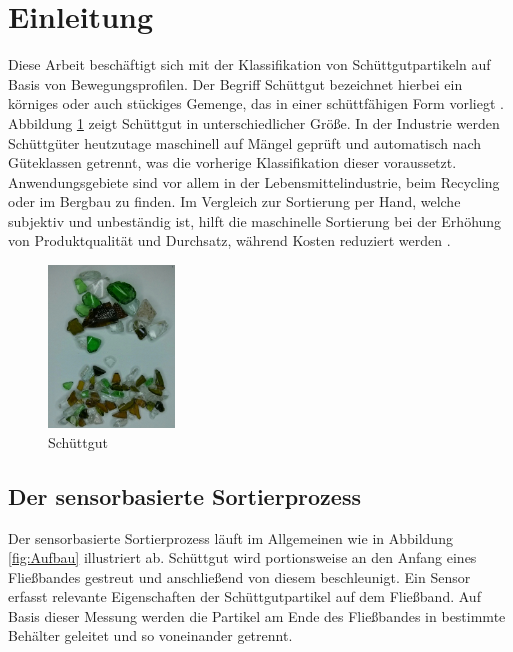 
\section{Einleitung}
Diese Arbeit beschäftigt sich mit der Klassifikation von Schüttgutpartikeln auf Basis von Bewegungsprofilen. Der Begriff Schüttgut bezeichnet hierbei ein körniges oder auch stückiges Gemenge, das in einer schüttfähigen Form vorliegt \cite{SchuettgutDef}. Abbildung \ref{fig:Schuettgut} zeigt Schüttgut in unterschiedlicher Größe. In der Industrie werden Schüttgüter heutzutage maschinell auf Mängel geprüft und automatisch nach Güteklassen getrennt, was die vorherige Klassifikation dieser voraussetzt. Anwendungsgebiete sind vor allem in der Lebensmittelindustrie, beim Recycling oder im Bergbau zu finden. Im Vergleich zur Sortierung per Hand, welche subjektiv und unbeständig ist, hilft die maschinelle Sortierung bei der Erhöhung von Produktqualität und Durchsatz, während Kosten reduziert werden \cite{FoodQuality}.

\begin{figure}[!h]
    \centering
    \includegraphics[width=0.3\textwidth]{pics/Schuettgut.png}
    \caption{Schüttgut}
    \label{fig:Schuettgut}
\end{figure}

\subsection{Der sensorbasierte Sortierprozess}
Der sensorbasierte Sortierprozess läuft im Allgemeinen wie in Abbildung \ref{fig:Aufbau} illustriert ab. Schüttgut wird portionsweise an den Anfang eines Fließbandes gestreut und anschließend von diesem beschleunigt. Ein Sensor erfasst relevante Eigenschaften der Schüttgutpartikel auf dem Fließband. Auf Basis dieser Messung werden die Partikel am Ende des Fließbandes in bestimmte Behälter geleitet und so voneinander getrennt.

